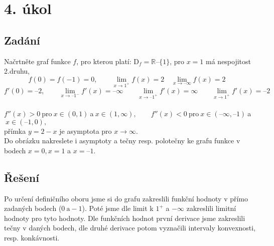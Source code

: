\section{4. úkol}
\subsection{Zadání}
    Načrtněte graf funkce $f$, pro kterou platí: $\text{D}_{f} = \mathbb{R} – \{1\}$, pro $x = 1$ má nespojitost 2.druhu,
	$$f(0) = f(-1) =0, \qquad \lim_{x\rightarrow 1^{+}} f(x) = 2\quad \lim_{x\rightarrow –\infty} f(x) = 2\quad$$
	$$f'(0) = –2, \qquad \lim_{x\rightarrow –1^{-}} f'(x) = – \infty \qquad \lim_{x\rightarrow –1^{+}} f'(x) = \infty \qquad  \lim_{x\rightarrow 1^{+}} f'(x) = – 2$$ \\
	$f''(x) > 0 \  $pro$ \  x \in (0,1) \ $a$ \ x \in (1,\infty), \qquad f''(x) < 0 \ $pro$ \ x \in (–\infty,–1)\  $a$ \  x \in (–1,0),$ \\
	přímka $y = 2 - x$ je asymptota pro $x\rightarrow \infty$. \\
	Do obrázku nakreslete i asymptoty a tečny resp. polotečny 
	ke grafu funkce v bodech $x = 0, x = 1$ a $x = –1$.

\subsection{Řešení}
Po určení definičního oboru jsme si do grafu zakreslili funkční hodnoty v přímo zadaných bodech ($0\ \text{a} -1$). Poté jsme dle limit k $1^+$ a $-\infty$ zakreslili limitní hodnoty pro tyto hodnoty. Dle funkčních hodnot první derivace jsme zakreslili tečny v daných bodech, dle druhé derivace potom vyznačili intervaly konvexnosti, resp. konkávnosti.
